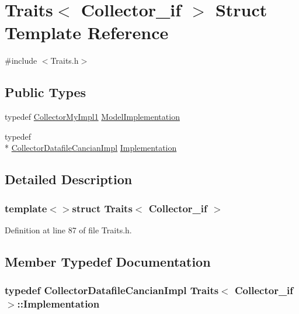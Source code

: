 \hypertarget{struct_traits_3_01_collector__if_01_4}{\section{Traits$<$ Collector\-\_\-if $>$ Struct Template Reference}
\label{struct_traits_3_01_collector__if_01_4}
}


{\ttfamily \#include $<$Traits.\-h$>$}

\subsection*{Public Types}
\begin{DoxyCompactItemize}
\item 
typedef \hyperlink{class_collector_my_impl1}{Collector\-My\-Impl1} \hyperlink{struct_traits_3_01_collector__if_01_4_a38ef8e0ef3488a361965174720a895ae}{Model\-Implementation}
\item 
typedef \\*
\hyperlink{class_collector_datafile_cancian_impl}{Collector\-Datafile\-Cancian\-Impl} \hyperlink{struct_traits_3_01_collector__if_01_4_ace32b8f4a29ef663d7f4dcf5e0971ef8}{Implementation}
\end{DoxyCompactItemize}


\subsection{Detailed Description}
\subsubsection*{template$<$$>$struct Traits$<$ Collector\-\_\-if $>$}



Definition at line 87 of file Traits.\-h.



\subsection{Member Typedef Documentation}
\hypertarget{struct_traits_3_01_collector__if_01_4_ace32b8f4a29ef663d7f4dcf5e0971ef8}{
\subsubsection[{Implementation}]{\setlength{\rightskip}{0pt plus 5cm}typedef {\bf Collector\-Datafile\-Cancian\-Impl} {\bf Traits}$<$ {\bf Collector\-\_\-if} $>$\-::{\bf Implementation}}}\label{struct_traits_3_01_collector__if_01_4_ace32b8f4a29ef663d7f4dcf5e0971ef8}


